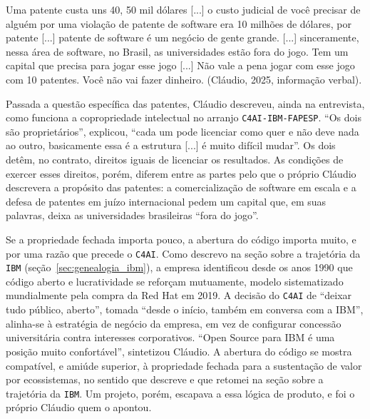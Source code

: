 \begin{citacaoabnt}
Uma patente custa uns 40, 50 mil dólares [...] o custo judicial de você precisar de alguém por uma violação de patente de software era 10 milhões de dólares, por patente [...] patente de software é um negócio de gente grande. [...] sinceramente, nessa área de software, no Brasil, as universidades estão fora do jogo. Tem um capital que precisa para jogar esse jogo [...] Não vale a pena jogar com esse jogo com 10 patentes. Você não vai fazer dinheiro. (Cláudio, 2025, informação verbal).
\end{citacaoabnt}
Passada a questão específica das patentes, Cláudio descreveu, ainda na entrevista, como funciona a copropriedade intelectual no arranjo \texttt{C4AI-IBM-FAPESP}. \enquote{Os dois são proprietários}, explicou, \enquote{cada um pode licenciar como quer e não deve nada ao outro, basicamente essa é a estrutura [...] é muito difícil mudar}. Os dois detêm, no contrato, direitos iguais de licenciar os resultados. As condições de exercer esses direitos, porém, diferem entre as partes pelo que o próprio Cláudio descrevera a propósito das patentes: a comercialização de software em escala e a defesa de patentes em juízo internacional pedem um capital que, em suas palavras, deixa as universidades brasileiras \enquote{fora do jogo}.


Se a propriedade fechada importa pouco, a abertura do código importa muito, e por uma razão que precede o \texttt{C4AI}. Como descrevo na seção sobre a trajetória da \texttt{IBM} (seção~\ref{sec:genealogia_ibm}), a empresa identificou desde os anos 1990 que código aberto e lucratividade se reforçam mutuamente, modelo sistematizado mundialmente pela compra da Red Hat em 2019. A decisão do \texttt{C4AI} de \enquote{deixar tudo público, aberto}, tomada \enquote{desde o início, também em conversa com a IBM}, alinha-se à estratégia de negócio da empresa, em vez de configurar concessão universitária contra interesses corporativos. \enquote{Open Source para IBM é uma posição muito confortável}, sintetizou Cláudio. A abertura do código se mostra compatível, e amiúde superior, à propriedade fechada para a sustentação de valor por ecossistemas, no sentido que \textcite{weber2004success} descreve e que retomei na seção sobre a trajetória da \texttt{IBM}. Um projeto, porém, escapava a essa lógica de produto, e foi o próprio Cláudio quem o apontou.

